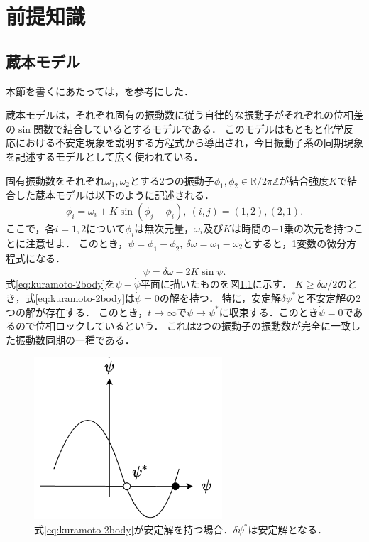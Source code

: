 \documentclass[../main]{subfiles}
\begin{document}
\chapter{前提知識}
\label{chap:prev}
\section{蔵本モデル}
本節を書くにあたっては，\cite{RODRIGUES20161,biorhythm}を参考にした．

蔵本モデルは，それぞれ固有の振動数に従う自律的な振動子がそれぞれの位相差の$\sin$関数で結合しているとするモデルである．
このモデルはもともと化学反応における不安定現象を説明する方程式から導出され\cite{kuramoto1975}，今日振動子系の同期現象を記述するモデルとして広く使われている．

固有振動数をそれぞれ$\omega_1,\omega_2$とする2つの振動子$\phi_1,\phi_2\in\mathbb{R}/2\pi\mathbb{Z}$が結合強度$K$で結合した蔵本モデルは以下のように記述される．
\begin{equation}
    \label{eq:kuramoto-2}
    \dot{\phi}_i=\omega_i+K\sin(\phi_j-\phi_i),\ (i,j)=(1,2),(2,1).
\end{equation}
ここで，各$i=1,2$について$\phi_i$は無次元量，$\omega_i$及び$K$は時間の$-1$乗の次元を持つことに注意せよ．
このとき，$\psi=\phi_1-\phi_2,\ \delta\omega=\omega_1-\omega_2$とすると，1変数の微分方程式になる．
\begin{equation}
    \label{eq:kuramoto-2body}
    \dot{\psi}=\delta\omega-2K\sin\psi.  
\end{equation}
式\eqref{eq:kuramoto-2body}を$\psi-\dot{\psi}$平面に描いたものを図\ref{fig:kuramoto-2}に示す．
$K\geq\delta\omega/2$のとき，式\eqref{eq:kuramoto-2body}は$\dot{\psi}=0$の解を持つ．
特に，安定解$\delta\psi^\ast$と不安定解の2つの解が存在する．
このとき，$t\to\infty$で$\psi\to\psi^\ast$に収束する．このとき$\dot{\psi}=0$であるので位相ロックしているという．
これは2つの振動子の振動数が完全に一致した振動数同期の一種である．

\begin{figure}[tbp]
\centering
\includegraphics[width=70mm]{images/kuramoto-2.pdf}
\centering
\caption{式\eqref{eq:kuramoto-2body}が安定解を持つ場合．$\delta\psi^\ast$は安定解となる．}
\label{fig:kuramoto-2}
\end{figure}
\end{document}
